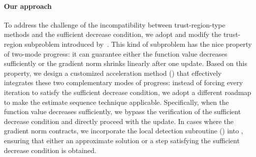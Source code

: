 \documentclass{article}
\theoremstyle{plain}
\theoremstyle{definition}
\theoremstyle{remark}
\begin{document}
\paragraph{Our approach}
To address the challenge of the incompatibility between trust-region-type methods and the sufficient decrease condition, we adopt and modify the trust-region subproblem introduced by~\citet{jiang2024nonconvexityuniversaltrustregionmethod}. This kind of subproblem has the nice property of two-mode progress: it can guarantee either the function value decreases sufficiently or the gradient norm shrinks linearly after one update. Based on this property, we design a customized acceleration method () that effectively integrates these two complementary modes of progress: instead of forcing every iteration to satisfy the sufficient decrease condition, we adopt a different roadmap to make the estimate sequence technique applicable. Specifically, when the function value decreases sufficiently, we bypass the verification of the sufficient decrease condition and directly proceed with the update. In cases where the gradient norm contracts, we incorporate the local detection subroutine () into , ensuring that either an approximate solution or a step satisfying the sufficient decrease condition is obtained.

\end{document}
